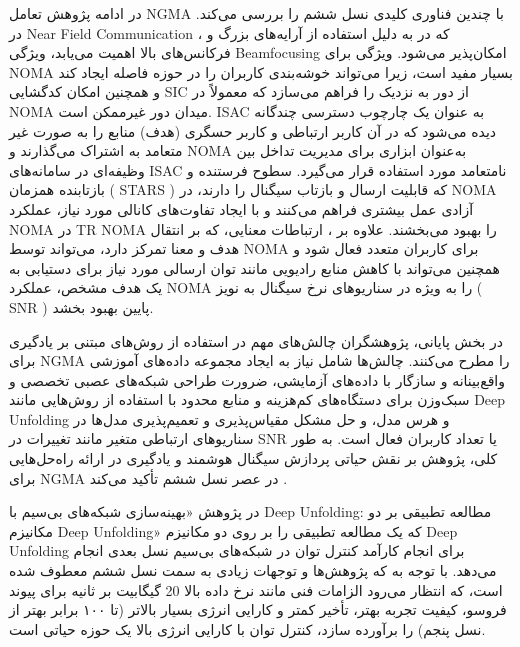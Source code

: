 در ادامه پژوهش تعامل 
\gls{NGMA}
 با چندین فناوری کلیدی نسل ششم را بررسی می‌کند. در 
\gls{Near Field Communication}
 ، که در  به دلیل استفاده از آرایه‌های بزرگ و فرکانس‌های بالا اهمیت می‌یابد، ویژگی 
\gls{Beamfocusing}
 امکان‌پذیر می‌شود.  ویژگی برای 
\gls{NOMA}
  بسیار مفید است، زیرا می‌تواند خوشه‌بندی کاربران را در حوزه فاصله ایجاد کند و همچنین امکان کدگشایی 
\gls{SIC}
   از دور به نزدیک را فراهم می‌سازد که معمولاً در 
\gls{NOMA}
    میدان دور غیرممکن است. 
\gls{ISAC}
     به عنوان یک چارچوب دسترسی چندگانه دیده می‌شود که در آن کاربر ارتباطی و کاربر حسگری (هدف) منابع را به صورت غیر متعامد به اشتراک می‌گذارند و 
\gls{NOMA}
      به‌عنوان ابزاری برای مدیریت تداخل بین وظیفه‌ای در سامانه‌های 
\gls{ISAC}
       نامتعامد مورد استفاده قرار می‌گیرد. سطوح فرستنده و بازتابنده همزمان ( 
\gls{STARS}
      )  که قابلیت ارسال و بازتاب سیگنال را دارند، در 
\gls{NOMA}
      آزادی عمل بیشتری فراهم می‌کنند و با ایجاد تفاوت‌های کانالی مورد نیاز، عملکرد 
\gls{NOMA}
       در 
\gls{TR NOMA}
        را بهبود می‌بخشند. علاوه بر ، ارتباطات معنایی، که بر انتقال هدف و معنا تمرکز دارد، می‌تواند توسط 
\gls{NOMA}
         برای کاربران متعدد فعال شود و همچنین می‌تواند با کاهش منابع رادیویی مانند توان ارسالی مورد نیاز برای دستیابی به یک هدف مشخص، عملکرد 
\gls{NOMA}
          را به ویژه در سناریوهای نرخ سیگنال به نویز (
\gls{SNR}
          ) پایین بهبود بخشد.

در بخش پایانی، پژوهشگران چالش‌های مهم در استفاده از روش‌های مبتنی بر یادگیری برای 
\gls{NGMA}
 را مطرح می‌کنند.  چالش‌ها شامل نیاز به ایجاد مجموعه داده‌های آموزشی واقع‌بینانه و سازگار با داده‌های آزمایشی، ضرورت طراحی شبکه‌های عصبی تخصصی و سبک‌وزن برای دستگاه‌های کم‌هزینه و منابع محدود با استفاده از روش‌هایی مانند 
\gls{Deep Unfolding}
 و هرس مدل، و حل مشکل مقیاس‌پذیری و تعمیم‌پذیری مدل‌ها در سناریوهای ارتباطی متغیر مانند تغییرات در 
\gls{SNR}
  یا تعداد کاربران فعال است. به طور کلی، پژوهش بر نقش حیاتی پردازش سیگنال هوشمند و یادگیری در ارائه راه‌حل‌هایی برای 
\gls{NGMA}
  در عصر نسل ششم تأکید می‌کند
\cite{SignalProcessing}.

در پژوهش «بهینه‌سازی شبکه‌های بی‌سیم با 
\gls{Deep Unfolding}:
 مطالعه تطبیقی بر دو مکانیزم 
\gls{Deep Unfolding}»
که یک مطالعه تطبیقی را بر روی دو مکانیزم 
\gls{Deep Unfolding}
 برای انجام کارآمد کنترل توان در شبکه‌های بی‌سیم نسل بعدی انجام می‌دهد. با توجه به که پژوهش‌ها و توجهات زیادی به سمت نسل ششم معطوف شده است، که انتظار می‌رود الزامات فنی مانند نرخ داده بالا 20 گیگابیت بر ثانیه برای پیوند فروسو، کیفیت تجربه بهتر، تأخیر کمتر و کارایی انرژی بسیار بالاتر (تا ۱۰۰ برابر بهتر از نسل پنجم) را برآورده سازد، کنترل توان با کارایی انرژی بالا یک حوزه حیاتی است. 
 
